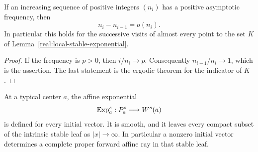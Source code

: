 \begin{lemma}\label{real:returns}
If an increasing sequence of positive integers $(n_i)$ has a
positive asymptotic frequency, then
\[
 n_i-n_{i-1}=o(n_i).
\]
In particular this holds for the successive visits of almost every
point to the set $K$ of
Lemma~\ref{real:local-stable-exponential}.
\end{lemma}

\begin{proof}
If the frequency is $p>0$, then $i/n_i\to p$. Consequently
$n_{i-1}/n_i\to1$, which is the assertion. The last statement is
the ergodic theorem for the indicator of $K$.
\end{proof}

\begin{proposition}\label{real:proper-exponential}
At a typical center $a$, the affine exponential
\[
 \operatorname{Exp}^s_a:P^s_a\longrightarrow W^s(a)
\]
is defined for every initial vector. It is smooth, and it leaves
every compact subset of the intrinsic stable leaf as $|x|\to\infty$.
In particular a nonzero initial vector determines a complete
proper forward affine ray in that stable leaf.
\end{proposition}

